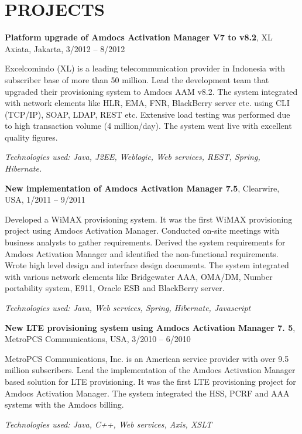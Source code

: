 \documentclass[10pt]{article}
\begin{document}
\section*{PROJECTS}
\begin{cvitem}
\textbf{Platform upgrade of Amdocs Activation Manager V7 to v8.2}, XL Axiata, Jakarta, 3/2012 -- 8/2012\par
Excelcomindo (XL) is a leading telecommunication provider in Indonesia with subscriber base of more than 50 million. Lead the development team that upgraded their provisioning system to Amdocs AAM v8.2. The system integrated with network elements like HLR, EMA, FNR, BlackBerry server etc. using CLI (TCP/IP), SOAP, LDAP, REST etc. Extensive load testing was performed due to high transaction volume (4 million/day). The system went live with excellent quality figures.\par
\textit{Technologies used: Java, J2EE, Weblogic, Web services, REST, Spring, Hibernate.}
\end{cvitem}
\begin{cvitem}
\textbf{New implementation of Amdocs Activation Manager 7.5}, Clearwire, USA, 1/2011 -- 9/2011\par
Developed a WiMAX provisioning system. It was the first WiMAX provisioning project using Amdocs Activation Manager. Conducted on-site meetings with business analysts to gather requirements. Derived the system requirements for Amdocs Activation Manager and identified the non-functional requirements. Wrote high level design and interface design documents. The system integrated with various network elements like Bridgewater AAA, OMA/DM, Number portability system, E911, Oracle ESB and BlackBerry server.\par
\textit{Technologies used: Java, Web services, Spring, Hibernate, Javascript}
\end{cvitem}
\begin{cvitem}
\textbf{New LTE provisioning system using Amdocs Activation Manager 7. 5}, MetroPCS Communications, USA, 3/2010 -- 6/2010\par
MetroPCS Communications, Inc. is an American service provider with over 9.5 million subscribers. Lead the implementation of the Amdocs Activation Manager based solution for LTE provisioning. It was the first LTE provisioning project for Amdocs Activation Manager. The system integrated the HSS, PCRF and AAA systems with the Amdocs billing.\par
\textit{Technologies used: Java, C++, Web services, Axis, XSLT}
\end{cvitem}
\end{document}
